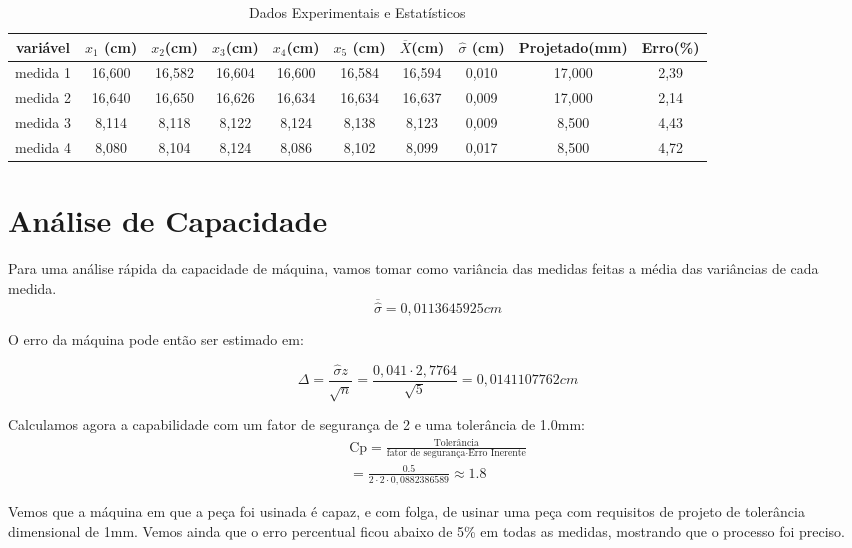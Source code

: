 \begin{table*}[t]
\centering
\begin{tabular}{|c|c|c|c|c|c|c|c|c|c|} \hline
variável & $x_1$ (cm)& $x_2$(cm) & $x_3$(cm)& $x_4$(cm)& $x_5$ (cm)& $\overline{X}$(cm) & $\widehat{\sigma}$ (cm) & Projetado(mm) & Erro(\%) \\ \hline
medida 1& 16,600& 16,582&  16,604 & 16,600 & 16,584 &  16,594 &0,010  & 17,000 &2,39  \\ \hline
medida 2& 16,640& 16,650& 16,626& 16,634& 16,634 &16,637  & 0,009& 17,000 & 2,14\\ \hline
medida 3& 8,114 & 8,118 & 8,122& 8,124 & 8,138 & 8,123 & 0,009 &8,500 & 4,43\\ \hline
medida 4& 8,080& 8,104& 8,124& 8,086& 8,102 &8,099  & 0,017 & 8,500  & 4,72\\ \hline
\end{tabular}
\caption{Dados Experimentais e Estatísticos}
\label{tab:dados}
\end{table*}

\section{Análise de Capacidade}

Para uma análise rápida da capacidade de máquina, vamos tomar como variância das medidas feitas a média das variâncias de 
cada medida. 
\begin{equation}
	\overline{\widehat{\sigma}} =0,0113645925 cm
\end{equation}

O erro da máquina pode então ser estimado em:

\begin{equation}
\Delta = \frac{\widehat{\sigma}z}{\sqrt{n}}  = \frac{0,041 \cdot  2,7764}{\sqrt{5}} = 0,0141107762 cm
\end{equation}

Calculamos agora a capabilidade com um fator de segurança de 2 e uma tolerância de 1.0mm:
\begin{equation}
\begin{array}{l}
 	\mbox{Cp} = \frac{\mbox{Tolerância}}{ \mbox{fator de segurança} \cdot \mbox{Erro Inerente}}  \\
 	= \frac{0.5}{2 \cdot 2 \cdot 0,0882386589} \approx 1.8
\end{array}
 \end{equation}
 
 Vemos que a máquina em que a peça foi usinada é capaz, e com folga, de usinar uma peça com requisitos de projeto de tolerância dimensional
 de 1mm. Vemos ainda que o erro percentual ficou abaixo de 5\% em todas as medidas, mostrando que o processo foi preciso.
 
